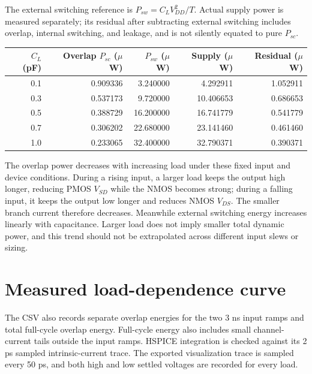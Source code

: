 \documentclass[11pt]{article}
\begin{document}
The external switching reference is $P_{sw}=C_LV_{DD}^2/T$. Actual supply power is measured separately; its residual after subtracting external switching includes overlap, internal switching, and leakage, and is not silently equated to pure $P_{sc}$.
\begin{center}\begin{tabular}{rrrrr}\toprule $C_L$ (pF)&Overlap $P_{sc}$ ($\mu$W)&$P_{sw}$ ($\mu$W)&Supply ($\mu$W)&Residual ($\mu$W)\\\midrule
0.1&0.909336&3.240000&4.292911&1.052911\\
0.3&0.537173&9.720000&10.406653&0.686653\\
0.5&0.388729&16.200000&16.741779&0.541779\\
0.7&0.306202&22.680000&23.141460&0.461460\\
1.0&0.233065&32.400000&32.790371&0.390371\\
\bottomrule\end{tabular}\end{center}
The overlap power decreases with increasing load under these fixed input and device conditions. During a rising input, a larger load keeps the output high longer, reducing PMOS $V_{SD}$ while the NMOS becomes strong; during a falling input, it keeps the output low longer and reduces NMOS $V_{DS}$. The smaller branch current therefore decreases. Meanwhile external switching energy increases linearly with capacitance. Larger load does not imply smaller total dynamic power, and this trend should not be extrapolated across different input slews or sizing.

\newpage\section*{Measured load-dependence curve}
\begin{center}\end{center}
The CSV also records separate overlap energies for the two 3 ns input ramps and total full-cycle overlap energy. Full-cycle energy also includes small channel-current tails outside the input ramps. HSPICE integration is checked against its 2 ps sampled intrinsic-current trace. The exported visualization trace is sampled every 50 ps, and both high and low settled voltages are recorded for every load.
\end{document}
